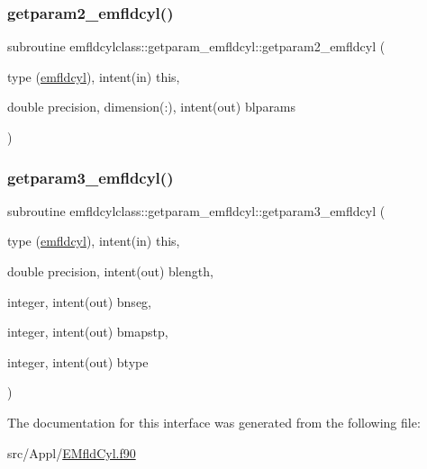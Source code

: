 \mbox{\label{interfaceemfldcylclass_1_1getparam__emfldcyl_af8daf9322dc5c8d3527b89e1cb692688}} 
\subsubsection{\texorpdfstring{getparam2\_emfldcyl()}{getparam2\_emfldcyl()}}
{\footnotesize\ttfamily subroutine emfldcylclass\+::getparam\+\_\+emfldcyl\+::getparam2\+\_\+emfldcyl (\begin{DoxyParamCaption}\item[{type (\mbox{\hyperlink{namespaceemfldcylclass_structemfldcylclass_1_1emfldcyl}{emfldcyl}}), intent(in)}]{this,  }\item[{double precision, dimension(\+:), intent(out)}]{blparams }\end{DoxyParamCaption})}

\mbox{\label{interfaceemfldcylclass_1_1getparam__emfldcyl_aef691e07cb8b99a1c1c3de2a7089f70d}} 
\subsubsection{\texorpdfstring{getparam3\_emfldcyl()}{getparam3\_emfldcyl()}}
{\footnotesize\ttfamily subroutine emfldcylclass\+::getparam\+\_\+emfldcyl\+::getparam3\+\_\+emfldcyl (\begin{DoxyParamCaption}\item[{type (\mbox{\hyperlink{namespaceemfldcylclass_structemfldcylclass_1_1emfldcyl}{emfldcyl}}), intent(in)}]{this,  }\item[{double precision, intent(out)}]{blength,  }\item[{integer, intent(out)}]{bnseg,  }\item[{integer, intent(out)}]{bmapstp,  }\item[{integer, intent(out)}]{btype }\end{DoxyParamCaption})}



The documentation for this interface was generated from the following file\+:\begin{DoxyCompactItemize}
\item 
src/\+Appl/\mbox{\hyperlink{_e_mfld_cyl_8f90}{E\+Mfld\+Cyl.\+f90}}\end{DoxyCompactItemize}
